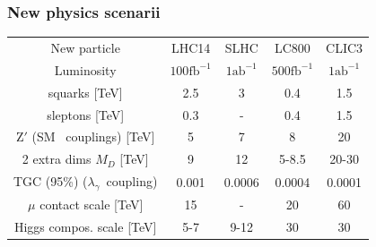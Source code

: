 \documentclass{beamer}
\begin{document}
\begin{frame}
\frametitle{New physics scenarii}
\begin{center}
{\scriptsize
 \begin{tabular}{ ccccc }
    \toprule
 New particle &     LHC14 & SLHC & LC800 & CLIC3\\
 Luminosity & $100\textrm{fb}^{-1}$ & $1\textrm{ab}^{-1}$&
 $500\textrm{fb}^{-1}$& $1\textrm{ab}^{-1}$\\
\midrule
squarks [TeV] &   2.5 & 3 & 0.4 & 1.5 \\
sleptons [TeV] &   0.3 & - & 0.4 & 1.5 \\ 
$\textrm{Z}'$ ({\tiny SM ~couplings}) [TeV]  &  5 & 7 & 8 & 20   \\ 
2 extra dims $M_D$ [TeV]  &    9 & 12 & 5-8.5 & 20-30 \\
TGC (95\%)  ({\tiny \rm $\lambda_{\gamma} $~coupling}) &   0.001& 0.0006& 0.0004& 0.0001 \\
$\mu$ contact scale [TeV] &  15& - & 20 & 60 \\
Higgs compos. scale [TeV] & 5-7 & 9-12 & 30 & 30\\
    \bottomrule
  \end{tabular}
  }
 \end{center}
\end{frame}
\end{document}
